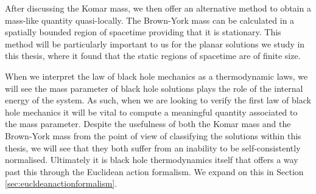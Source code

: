 After discussing the Komar mass, we then offer an alternative method to obtain a mass-like quantity quasi-locally. The Brown-York mass can be calculated in a spatially bounded region of spacetime providing that it is stationary. This method will be particularly important to us for the planar solutions we study in this thesis, where it found that the static regions of spacetime are of finite size.

When we interpret the law of black hole mechanics as a thermodynamic laws, we will see the mass parameter of black hole solutions plays the role of the internal energy of the system. As such, when we are looking to verify the first law of black hole mechanics it will be vital to compute a meaningful quantity associated to the mass parameter. Despite the usefulness of both the Komar mass and the Brown-York mass from the point of view of classifying the solutions within this thesis, we will see that they both suffer from an inability to be self-consistently normalised. Ultimately it is black hole thermodynamics itself that offers a way past this through the Euclidean action formalism. We expand on this in Section \ref{sec:eucldeanactionformalism}.

